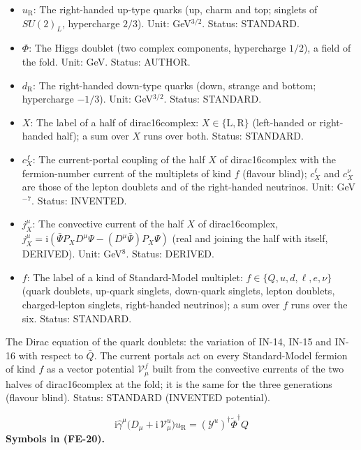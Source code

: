 \documentclass[
  10pt,
]{article}
\begin{document}
\begin{itemize}
  \(\tilde\Phi = \mathrm{i}\tau^2\Phi^*\) (hypercharge \(-1/2\)). Unit:
  GeV. Status: STANDARD.
\item
  \(u_{\mathrm{R}}\): The right-handed up-type quarks (up, charm and
  top; singlets of \(SU(2)_L\), hypercharge \(2/3\)). Unit:
  GeV\(^{3/2}\). Status: STANDARD.
\item
  \(\Phi\): The Higgs doublet (two complex components, hypercharge
  \(1/2\)), a field of the fold. Unit: GeV. Status: AUTHOR.
\item
  \(d_{\mathrm{R}}\): The right-handed down-type quarks (down, strange
  and bottom; hypercharge \(-1/3\)). Unit: GeV\(^{3/2}\). Status:
  STANDARD.
\item
  \(X\): The label of a half of dirac16complex:
  \(X \in \{\mathrm{L}, \mathrm{R}\}\) (left-handed or right-handed
  half); a sum over \(X\) runs over both. Status: STANDARD.
\item
  \(c^{f}_X\): The current-portal coupling of the half \(X\) of
  dirac16complex with the fermion-number current of the multiplets of
  kind \(f\) (flavour blind); \(c^{\ell}_X\) and \(c^{\nu}_X\) are those
  of the lepton doublets and of the right-handed neutrinos. Unit:
  GeV\(^{-7}\). Status: INVENTED.
\item
  \(j_X^\mu\): The convective current of the half \(X\) of
  dirac16complex,
  \(j_X^\mu = \mathrm{i}(\bar\Psi P_XD^\mu\Psi - (D^\mu\bar\Psi)P_X\Psi)\)
  (real and joining the half with itself, DERIVED). Unit: GeV\(^8\).
  Status: DERIVED.
\item
  \(f\): The label of a kind of Standard-Model multiplet:
  \(f \in \{Q, u, d, \ell, e, \nu\}\) (quark doublets, up-quark
  singlets, down-quark singlets, lepton doublets, charged-lepton
  singlets, right-handed neutrinos); a sum over \(f\) runs over the six.
  Status: STANDARD.
\end{itemize}

The Dirac equation of the quark doublets: the variation of IN-14, IN-15
and IN-16 with respect to \(\bar Q\). The current portals act on every
Standard-Model fermion of kind \(f\) as a vector potential
\(\mathcal{V}^{f}_\mu\) built from the convective currents of the two
halves of dirac16complex at the fold; it is the same for the three
generations (flavour blind). Status: STANDARD (INVENTED potential).

\[
\mathrm{i}\hat\gamma^\mu\big(D_\mu + \mathrm{i}\,\mathcal{V}^{u}_\mu\big)u_{\mathrm{R}} = (\mathcal{Y}^{u})^\dagger\tilde\Phi^\dagger Q \tag{FE-20}
\] \textbf{Symbols in (FE-20).}
\end{document}
